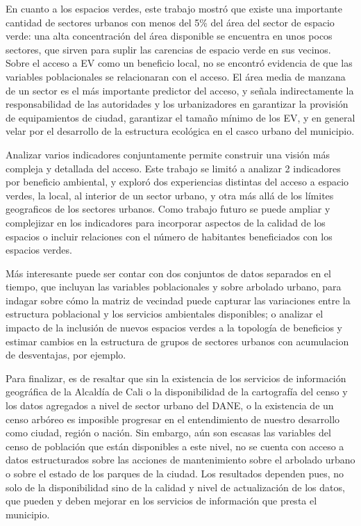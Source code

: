 \documentclass[12pt,a4paper,oneside, openany]{book}
\theoremstyle{definition}
\theoremstyle{definition}
\theoremstyle{definition}
\theoremstyle{remark}
\begin{document}
En cuanto a los espacios verdes, este trabajo mostró que existe una
importante cantidad de sectores urbanos con menos del 5\% del área del
sector de espacio verde: una alta concentración del área disponible se
encuentra en unos pocos sectores, que sirven para suplir las carencias
de espacio verde en sus vecinos. Sobre el acceso a EV como un beneficio
local, no se encontró evidencia de que las variables poblacionales se
relacionaran con el acceso. El área media de manzana de un sector es el
más importante predictor del acceso, y señala indirectamente la
responsabilidad de las autoridades y los urbanizadores en garantizar la
provisión de equipamientos de ciudad, garantizar el tamaño mínimo de los
EV, y en general velar por el desarrollo de la estructura ecológica en
el casco urbano del municipio.

Analizar varios indicadores conjuntamente permite construir una visión
más compleja y detallada del acceso. Este trabajo se limitó a analizar 2
indicadores por beneficio ambiental, y exploró dos experiencias
distintas del acceso a espacio verdes, la local, al interior de un
sector urbano, y otra más allá de los límites geograficos de los
sectores urbanos. Como trabajo futuro se puede ampliar y complejizar en
los indicadores para incorporar aspectos de la calidad de los espacios o
incluir relaciones con el número de habitantes beneficiados con los
espacios verdes.

Más interesante puede ser contar con dos conjuntos de datos separados en
el tiempo, que incluyan las variables poblacionales y sobre arbolado
urbano, para indagar sobre cómo la matriz de vecindad puede capturar las
variaciones entre la estructura poblacional y los servicios ambientales
disponibles; o analizar el impacto de la inclusión de nuevos espacios
verdes a la topología de beneficios y estimar cambios en la estructura
de grupos de sectores urbanos con acumulacion de desventajas, por
ejemplo.

Para finalizar, es de resaltar que sin la existencia de los servicios de
información geográfica de la Alcaldía de Cali o la disponibilidad de la
cartografía del censo y los datos agregados a nivel de sector urbano del
DANE, o la existencia de un censo arbóreo es imposible progresar en el
entendimiento de nuestro desarrollo como ciudad, región o nación. Sin
embargo, aún son escasas las variables del censo de población que están
disponibles a este nivel, no se cuenta con acceso a datos estructurados
sobre las acciones de mantenimiento sobre el arbolado urbano o sobre el
estado de los parques de la ciudad. Los resultados dependen pues, no
solo de la disponibilidad sino de la calidad y nivel de actualización de
los datos, que pueden y deben mejorar en los servicios de información
que presta el municipio.
\end{document}
